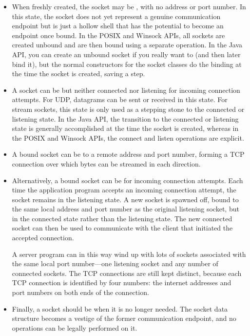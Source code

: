 \begin{itemize}
\item
When freshly created, the socket may be , with no address or
port number.  In this state, the socket does not yet represent a
genuine communication endpoint but is just a hollow shell that has
the potential to become an endpoint once bound.  In the POSIX and
Winsock APIs, all sockets are created unbound and are then bound using
a separate operation.  In the Java API, you can create an unbound
socket if you really want to (and then later bind it), but the normal
constructors for the socket classes do the binding at the time the
socket is created, saving a step.
\item
A socket can be  but neither connected nor listening for
incoming connection attempts.  For UDP, datagrams can be sent or
received in this state.  For stream sockets, this state is only used
as a stepping stone to the connected or listening state.  In the Java
API, the transition to the connected or listening state is generally
accomplished at the time the socket is created, whereas in the POSIX
and Winsock APIs, the connect and listen operations are explicit.
\item
A bound socket can be  to a remote address and port number,
forming a TCP connection over which bytes can be streamed in each
direction.
\item
Alternatively, a bound socket can be  for incoming connection
attempts.  Each time the application program accepts an incoming
connection attempt, the socket remains in the listening state.  A
new socket is spawned off, bound to the same local address and port
number as the original listening socket, but in the connected state
rather than the listening state.  The new connected socket can then be
used to communicate with the client that initiated the accepted
connection.

A server program can in this way wind up with lots of
sockets associated with the same local port number---one listening
socket and any number of connected sockets.  The TCP
connections are still kept distinct, because each TCP connection is
identified by four numbers: the internet addresses and port numbers on
both ends of the connection.
\item
Finally, a socket should be  when it is no longer needed.  The
socket data structure becomes a vestige of the former
communication endpoint, and no operations can be legally performed on
it.
\end{itemize}

